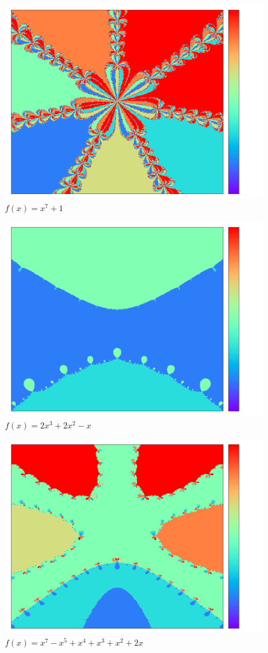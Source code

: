 \documentclass{article}
\begin{document}
\begin{figure}[!hbt]
	\centering
	\includegraphics[width=0.7\linewidth]{imagens/[1, 0, 0, 0, 0, 0, 0, 1].png}
	\caption{$f(x) = x^{7} + 1$}
\end{figure}

\begin{figure}[!hbt]
	\centering
	\includegraphics[width=0.7\linewidth]{imagens/[2, 2, -1, 0].png}
	\caption{$f(x) = 2x^{3} + 2x^{2} - x$}
\end{figure}

\begin{figure}[!hbt]
	\centering
	\includegraphics[width=0.7\linewidth]{imagens/[1, 0, -1, 1, 0, 1, 2, 0].png}
	\caption{$f(x) = x^{7} -x^{5} + x^{4} + x^{3} + x^{2} + 2x$}
\end{figure}
\end{document}
